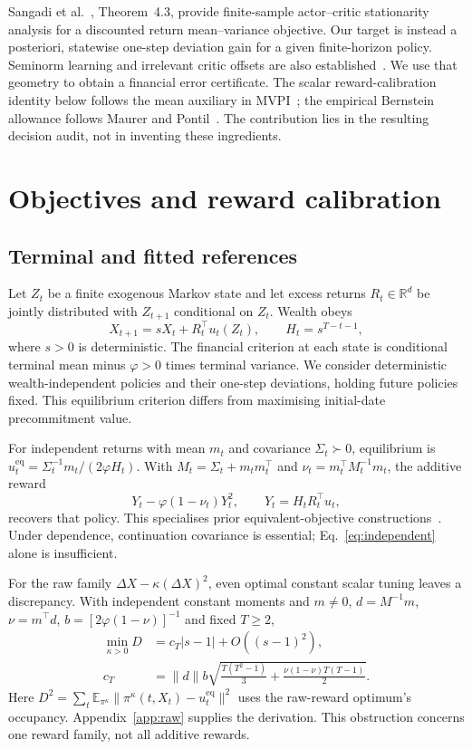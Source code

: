 \documentclass[sigconf,anonymous,review]{acmart}
\newcommand{\E}{\mathbb{E}}
\newcommand{\eq}{\mathrm{eq}}
\begin{document}
Sangadi et al.~\cite{sangadi2025}, Theorem~4.3, provide finite-sample actor--critic stationarity analysis for a discounted return mean--variance objective. Our target is instead a posteriori, statewise one-step deviation gain for a given finite-horizon policy. Seminorm learning and irrelevant critic offsets are also established~\cite{chen2025seminorm}. We use that geometry to obtain a financial error certificate. The scalar reward-calibration identity below follows the mean auxiliary in MVPI~\cite{zhang2021}; the empirical Bernstein allowance follows Maurer and Pontil~\cite{maurer2009}. The contribution lies in the resulting decision audit, not in inventing these ingredients.

\section{Objectives and reward calibration}
\subsection{Terminal and fitted references}
Let $Z_t $ be a finite exogenous Markov state and let excess returns $R_t\in\mathbb R^d $ be jointly distributed with $Z_{t+1}$ conditional on $Z_t $. Wealth obeys
\begin{equation}\label{eq:wealth}
 X_{t+1}=sX_t+R_t^\top u_t(Z_t),\qquad H_t=s^{T-t-1},
\end{equation}
where $s>0$ is deterministic. The financial criterion at each state is conditional terminal mean minus $\varphi>0$ times terminal variance. We consider deterministic wealth-independent policies and their one-step deviations, holding future policies fixed. This equilibrium criterion differs from maximising initial-date precommitment value.

For independent returns with mean $m_t $ and covariance $\Sigma_t\succ0$, equilibrium is $u_t^\eq=\Sigma_t^{-1}m_t/(2\varphi H_t)$. With $M_t=\Sigma_t+m_tm_t^\top $ and $\nu_t=m_t^\top M_t^{-1}m_t $, the additive reward
\begin{equation}\label{eq:independent}
 Y_t-\varphi(1-\nu_t)Y_t^2,\qquad Y_t=H_tR_t^\top u_t,
\end{equation}
recovers that policy. This specialises prior equivalent-objective constructions~\cite{bkm2016}. Under dependence, continuation covariance is essential; Eq.~\eqref{eq:independent} alone is insufficient.

For the raw family $\Delta X-\kappa(\Delta X)^2$, even optimal constant scalar tuning leaves a discrepancy. With independent constant moments and $m\ne0$, $d=M^{-1}m $, $\nu=m^\top d $, $b=[2\varphi(1-\nu)]^{-1}$ and fixed $T\ge2$,
\begin{align}\label{eq:raw}
\min_{\kappa>0}D&=c_T|s-1|+O((s-1)^2),\\
c_T&=\|d\|b\sqrt{\tfrac{T(T^2-1)}3+\tfrac{\nu(1-\nu)T(T-1)}2}.\nonumber
\end{align}
Here $D^2=\sum_t\E_{\pi^\kappa}\|\pi^\kappa(t,X_t)-u_t^\eq\|^2$ uses the raw-reward optimum's occupancy. Appendix~\ref{app:raw} supplies the derivation. This obstruction concerns one reward family, not all additive rewards.
\end{document}
